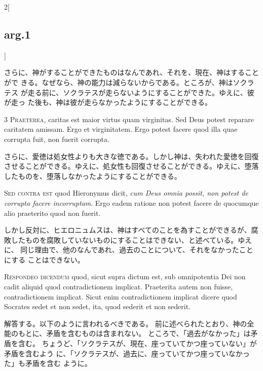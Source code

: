 \documentclass[paper=a4paper,fontsize=10pt,jafontsize=9pt,titlepage]{jlreq}
\begin{document}
\begin{paracol}{2}[\subsection{arg.1}]
\switchcolumn

さらに、神がすることができたものはなんであれ、それを、現在、神はすることがで
 きる。なぜなら、神の能力は減らないからである。ところが、神はソクラテス
 が走る前に、ソクラテスが走らないようにすることができた。ゆえに、彼が走っ
 た後も、神は彼が走らなかったようにすることができる。


{\scshape 3 Praeterea}, caritas est maior virtus quam
virginitas. Sed Deus potest reparare caritatem amissam. Ergo et
virginitatem. Ergo potest facere quod illa quae corrupta fuit, non
fuerit corrupta.

\switchcolumn

さらに、愛徳は処女性よりも大きな徳である。しかし神は、失われた愛徳を回復
させることができる。ゆえに、処女性も回復させることができる。ゆえに、堕落
したものを、堕落しなかったようにすることができる。

\switchcolumn*[\subsection{s.c.}]

{\scshape Sed contra est} quod Hieronymus dicit, {\itshape cum
Deus omnia possit, non potest de corrupta facere incorruptam}. Ergo eadem
ratione non potest facere de quocumque alio praeterito quod non fuerit.

\switchcolumn

しかし反対に、ヒエロニュムスは、神はすべてのことを為すことができるが、腐
敗したものを腐敗していないものにすることはできない、と述べている。ゆえに、
同じ理由で、他のなんであれ、過去のことについて、それをなかったことにする
 ことはできない。


{\scshape Respondeo dicendum} quod, sicut supra dictum
est, sub omnipotentia Dei non cadit aliquid quod contradictionem
implicat. Praeterita autem non fuisse, contradictionem implicat. Sicut
enim contradictionem implicat dicere quod Socrates sedet et non sedet,
ita, quod sederit et non sederit.

\switchcolumn

解答する。以下のように言われるべきである。
前に述べられたとおり、神の全能のもとに、矛盾を含むものは含まれない。
ところで、「過去がなかった」は矛盾を含む。
ちょうど、「ソクラテスが、現在、座っていてかつ座っていない」が矛盾を含むよう
に、「ソクラテスが、過去に、座っていてかつ座っていなかった」も矛盾を含む
ように。


\end{paracol}
\end{document}
